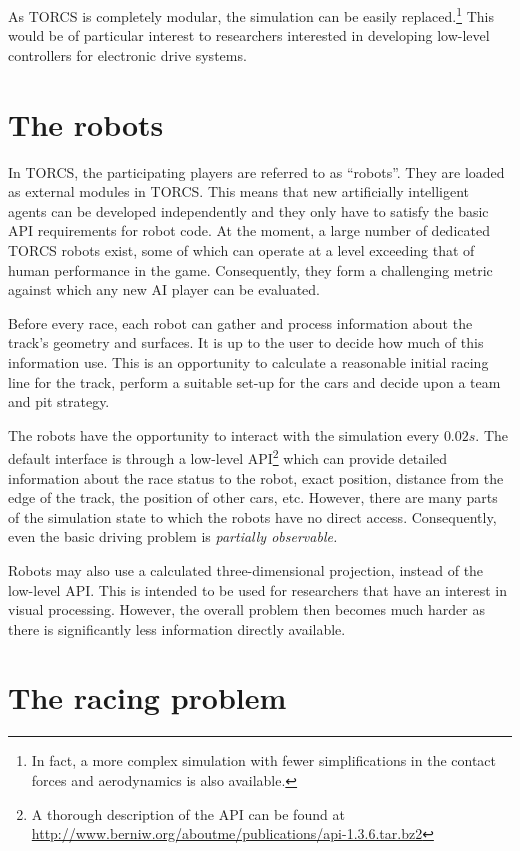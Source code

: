 \documentclass[a4paper]{article}
\begin{document}
As TORCS is completely modular, the simulation can be easily replaced.\footnote{In fact, a more complex simulation with fewer simplifications in the contact forces and aerodynamics is also available.}
This would be of particular interest to researchers interested in developing low-level controllers for electronic drive systems. 

\section{The robots}

In TORCS, the participating players are referred to as ``robots''. They are loaded as external modules in TORCS. This means that new artificially intelligent agents can be developed independently and they only have to satisfy the basic API requirements for robot code. At the moment, a large number of dedicated TORCS robots exist, some of which can operate at a level exceeding that of human performance in the game. Consequently, they form a challenging metric against which any new AI player can be evaluated.

Before every race, each robot can gather and process information about the track's geometry and surfaces. It is up to the user to decide how much of this information use. This is an opportunity to calculate a reasonable initial racing line for the track, perform a suitable set-up for the cars and decide upon a team and pit strategy.

The robots have the opportunity to interact with the simulation every $0.02s$. The default interface is through a low-level API\footnote{
{A thorough description of the API can be found at \url{http://www.berniw.org/aboutme/publications/api-1.3.6.tar.bz2}}} which can provide detailed information about the race status to the robot, exact position, distance from the edge of the track, the position of other cars, etc. However, there are many parts of the simulation state to which the robots have no direct access. Consequently, even the basic driving problem is \emph{partially observable.}

Robots may also use a calculated three-dimensional projection, instead of the low-level API. This is intended to be used for researchers that have an interest in visual processing. However, the overall problem then becomes much harder as there is significantly less information directly available. 

\section{The racing problem}
\end{document}
